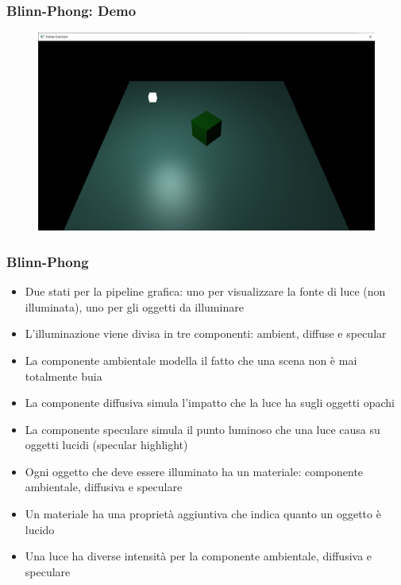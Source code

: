 \begin{frame}
\frametitle{Blinn-Phong: Demo}
\begin{figure}[ht]
    \centering
    \includegraphics[scale=0.25]{images/SlidesBlinnPhong/SceneMaterialsLight.png}
\end{figure}
\end{frame}

\begin{frame}
\frametitle{Blinn-Phong}
\begin{itemize}
\item Due stati per la pipeline grafica: uno per visualizzare la fonte di luce (non illuminata), uno per gli oggetti da illuminare
\item L'illuminazione viene divisa in tre componenti: ambient, diffuse e specular
\item La componente ambientale modella il fatto che una scena non è mai totalmente buia
\item La componente diffusiva simula l'impatto che la luce ha sugli oggetti opachi
\item La componente speculare simula il punto luminoso che una luce causa su oggetti lucidi (specular highlight)
\item Ogni oggetto che deve essere illuminato ha un materiale: componente ambientale, diffusiva e speculare
\item Un materiale ha una proprietà aggiuntiva che indica quanto un oggetto è lucido
\item Una luce ha diverse intensità per la componente ambientale, diffusiva e speculare
\end{itemize}
\end{frame}
